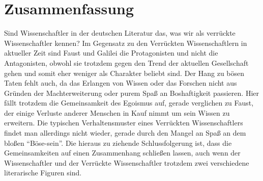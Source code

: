\documentclass[12pt]{scrreprt}
\begin{document}
\chapter{Zusammenfassung}
	\label{chap:zusammenfassung}
Sind Wissenschaftler in der deutschen Literatur das, was wir als verrückte Wissenschaftler kennen?
Im Gegensatz zu den Verrückten Wissenschaftlern in aktueller Zeit sind Faust und Galilei die Protagonisten und nicht die Antagonisten, obwohl sie trotzdem gegen den Trend der aktuellen Gesellschaft gehen und somit eher weniger als Charakter beliebt sind.
Der Hang zu bösen Taten fehlt auch, da das Erlangen von Wissen oder das Forschen nicht aus Gründen der Machterweiterung oder purem Spaß an Boshaftigkeit passieren.
Hier fällt trotzdem die Gemeinsamkeit des Egoismus auf, gerade verglichen zu Faust, der einige Verluste anderer Menschen in Kauf nimmt um sein Wissen zu erweitern.
Die typischen Verhaltensmuster eines Verrückten Wissenschaftlers findet man allerdings nicht wieder, gerade durch den Mangel an Spaß an dem bloßen \enquote{Böse-sein}.
Die hieraus zu ziehende Schlussfolgerung ist, dass die Gemeinsamkeiten auf einen Zusammenhang schließen lassen, auch wenn der Wissenschaftler und der Verrückte Wissenschaftler trotzdem zwei verschiedene literarische Figuren sind.

\printbibliography
\end{document}
